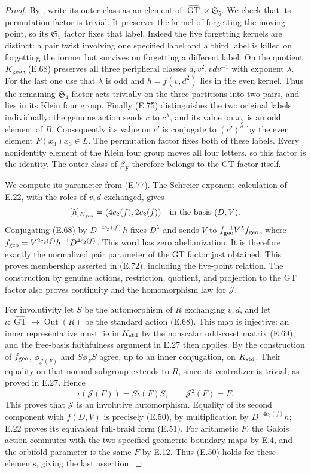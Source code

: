 \begin{proof}
By \cite[Corollary 2.8(i)]{ET_HMM2022}, write
its outer class as an element of
$\widehat{\operatorname{GT}}\times\mathfrak S_5$.
We check that its permutation factor is
trivial.  It preserves the kernel of
forgetting the moving point, so its
$\mathfrak S_5$ factor fixes that label.
Indeed the five forgetting kernels are
distinct: a pair twist involving one
specified label and a third label is killed
on forgetting the former but survives on
forgetting a different label.
On the quotient $K_{\rm geo}$, (E.68)
preserves all three peripheral classes
$d,v^2,vdv^{-1}$ with exponent $\lambda$.
For the last one use that $\lambda$ is odd
and $h=f(v,d^2)$ lies in the even kernel.
Thus the remaining $\mathfrak S_4$ factor
acts trivially on the three partitions into
two pairs, and lies in its Klein four group.
Finally (E.75) distinguishes the two original
labels individually: the genuine action
sends $c$ to $c^\lambda$, and its value on
$x_3$ is an odd element of $B$.
Consequently its value on $c'$ is conjugate
to $(c')^\lambda$ by the even element
$F(x_3)x_3\in L$.
The permutation factor fixes both of these
labels.  Every nonidentity element of the
Klein four group moves all four letters,
so this factor is the identity.
The outer class of $\beta_F$ therefore
belongs to the GT factor itself.

We compute its parameter from (E.77).
The Schreier exponent calculation of E.22,
with the roles of $v,d$ exchanged, gives
\[
       [h]_{K_{\rm geo}}=(4c_2(f),2c_2(f))
                     \quad\text{in the basis }(D,V).
\]
Conjugating (E.68) by
$D^{-4c_2(f)}h$ fixes $D^\lambda$ and sends
$V$ to $f_{\rm geo}^{-1}V^\lambda f_{\rm geo}$,
where
$f_{\rm geo}=V^{2c_2(f)}h^{-1}D^{4c_2(f)}$.
This word has zero abelianization.  It is
therefore exactly the normalized pair
parameter of the GT factor just obtained.
This proves membership asserted in (E.72),
including the five-point relation.
The construction by genuine actions,
restriction, quotient, and projection to
the GT factor also proves continuity and
the homomorphism law for $\mathcal J$.

For involutivity let $S$ be the automorphism
of $R$ exchanging $v,d$, and let
$\iota:\widehat{\operatorname{GT}}\to
\operatorname{Out}(R)$ be the standard action
(E.68).
This map is injective: an inner representative
must lie in $K_{\rm std}$ by the nonscalar
odd-coset matrix (E.69), and the free-basis
faithfulness argument in E.27 then applies.
By the construction of $f_{\rm geo}$,
$\phi_{\mathcal J(F)}$ and
$S\phi_FS$ agree, up to an inner conjugation,
on $K_{\rm std}$.
Their equality on that normal subgroup
extends to $R$, since its centralizer is
trivial, as proved in E.27.
Hence
\[
       \iota(\mathcal J(F))=S\iota(F)S,
                  \qquad\mathcal J^2(F)=F.              \tag{E.78}
\]
This proves that $\mathcal J$ is an
involutive automorphism.
Equality of its second component with
$f(D,V)$ is precisely (E.50), by multiplication
by $D^{-4c_2(f)}h$; E.22 proves its equivalent
full-braid form (E.51).
For arithmetic $F$, the Galois action
commutes with the two specified geometric
boundary maps by E.4, and the orbifold
parameter is the same $F$ by E.12.
Thus (E.50) holds for these elements,
giving the last assertion.
\end{proof}

